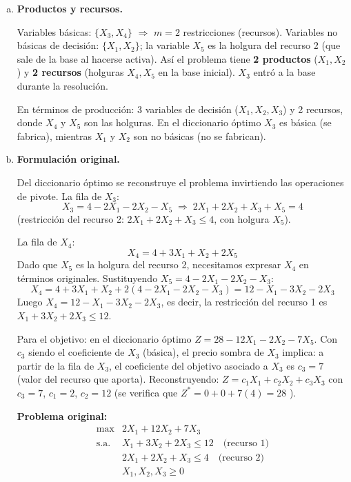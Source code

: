 \documentclass{article}
\begin{document}
\begin{enumerate}[a)]

\item \textbf{Productos y recursos.}

Variables básicas: $\{X_3, X_4\}$ $\Rightarrow$ $m = 2$ restricciones (recursos). Variables no básicas de decisión: $\{X_1, X_2\}$; la variable $X_5$ es la holgura del recurso 2 (que sale de la base al hacerse activa). Así el problema tiene \textbf{2 productos} ($X_1, X_2$) y \textbf{2 recursos} (holguras $X_4, X_5$ en la base inicial). $X_3$ entró a la base durante la resolución.

En términos de producción: 3 variables de decisión ($X_1, X_2, X_3$) y 2 recursos, donde $X_4$ y $X_5$ son las holguras. En el diccionario óptimo $X_3$ es básica (se fabrica), mientras $X_1$ y $X_2$ son no básicas (no se fabrican).

\item \textbf{Formulación original.}

Del diccionario óptimo se reconstruye el problema invirtiendo las operaciones de pivote. La fila de $X_3$:
\[
  X_3 = 4 - 2X_1 - 2X_2 - X_5 \;\Rightarrow\; 2X_1 + 2X_2 + X_3 + X_5 = 4
\]
(restricción del recurso 2: $2X_1 + 2X_2 + X_3 \leq 4$, con holgura $X_5$).

La fila de $X_4$:
\[
  X_4 = 4 + 3X_1 + X_2 + 2X_5
\]
Dado que $X_5$ es la holgura del recurso 2, necesitamos expresar $X_4$ en términos originales. Sustituyendo $X_5 = 4 - 2X_1 - 2X_2 - X_3$:
\[
  X_4 = 4 + 3X_1 + X_2 + 2(4 - 2X_1 - 2X_2 - X_3) = 12 - X_1 - 3X_2 - 2X_3
\]
Luego $X_4 = 12 - X_1 - 3X_2 - 2X_3$, es decir, la restricción del recurso 1 es $X_1 + 3X_2 + 2X_3 \leq 12$.

Para el objetivo: en el diccionario óptimo $Z = 28 - 12X_1 - 2X_2 - 7X_5$. Con $c_3$ siendo el coeficiente de $X_3$ (básica), el precio sombra de $X_3$ implica: a partir de la fila de $X_3$, el coeficiente del objetivo asociado a $X_3$ es $c_3 = 7$ (valor del recurso que aporta). Reconstruyendo: $Z = c_1 X_1 + c_2 X_2 + c_3 X_3$ con $c_3 = 7$, $c_1 = 2$, $c_2 = 12$ (se verifica que $Z^* = 0 + 0 + 7(4) = 28$ \checkmark).

\medskip
\textbf{Problema original:}
\[
\begin{array}{ll}
\max & 2X_1 + 12X_2 + 7X_3 \\
\text{s.a.} & X_1 + 3X_2 + 2X_3 \leq 12 \quad \text{(recurso 1)} \\
& 2X_1 + 2X_2 + X_3 \leq 4 \quad \text{(recurso 2)} \\
& X_1, X_2, X_3 \geq 0
\end{array}
\]


\end{enumerate}
\end{document}
